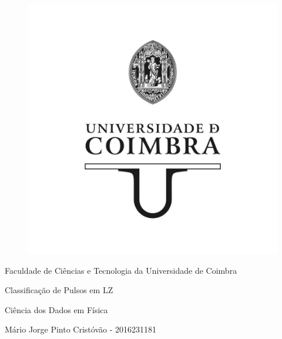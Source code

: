 \documentclass[10pt]{article} %
\begin{document}
\begin{center}
    \begin{figure}[H]
        \centering
        \includegraphics[scale=0.25]{Images/FCTUC_U_H}
    \end{figure}
    {\fontsize{17.28pt}{14pt}\selectfont Faculdade de Ciências e Tecnologia da Universidade de Coimbra \par}

    \vspace{2cm}
    {\fontsize{21pt}{14pt}\selectfont Classificação de Pulsos em LZ \par}
    \vspace{\baselineskip}
    \vspace{0.5cm}
    {\fontsize{12pt}{10pt}\selectfont Ciência dos Dados em Física \par\vspace{1em}}
    \vspace{0.5cm}
    {\fontsize{12pt}{10pt}\selectfont Mário Jorge Pinto Cristóvão - 2016231181 \par}
    \vspace{\baselineskip}

{\fontsize{9pt}{9pt}\selectfont  \par}


\end{center}
\newpage
\paragraph{}

\tableofcontents

\newpage    



\newpage
%
%
\end{document}

